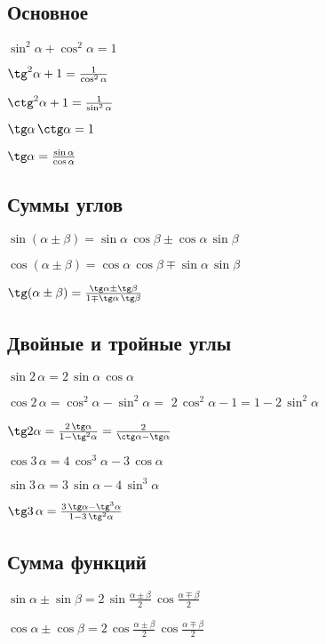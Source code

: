 \subsection{Основное}

$ \sin^2 \alpha + \cos^2 \alpha = 1 $

$ \tg^2 \alpha + 1 = \frac{1}{\cos^2 \alpha} $

$ \ctg^2 \alpha + 1 = \frac{1}{\sin^2 \alpha} $

$ \tg \alpha\, \ctg \alpha = 1 $

$ \tg \alpha = \frac{\sin \alpha}{\cos \alpha} $

\subsection{Суммы углов}

$ \sin(\alpha\pm \beta) = \sin \alpha\, \cos \beta \pm \cos \alpha\, \sin \beta $

$ \cos(\alpha\pm \beta) = \cos \alpha\, \cos \beta \mp \sin \alpha\, \sin \beta $

$ \tg (\alpha \pm \beta) = \frac{\tg \alpha \pm \tg \beta}{1 \mp \tg \alpha \, \tg \beta} $

\subsection{Двойные и тройные углы}

$ \sin 2\, \alpha = 2\, \sin \alpha\, \cos \alpha $

$ \cos 2\, \alpha = \cos^2 \alpha - \sin^2 \alpha = $ $ 2\, \cos^2 \alpha - 1 = 1 - 2\, \sin^2 \alpha $

$ \tg 2\alpha = \frac{2\, \tg \alpha}{1 - \tg^2 \alpha} = \frac{2}{\ctg \alpha - \tg \alpha} $

$ \cos 3\, \alpha = 4\, \cos^3 \alpha - 3\, \cos \alpha $

$ \sin 3\, \alpha = 3\, \sin \alpha - 4\, \sin^3 \alpha $

$ \tg 3\, \alpha = \frac{3\, \tg \alpha - \tg^3 \alpha}{1 - 3\, \tg^2 \alpha} $

\subsection{Сумма функций}

$ \sin \alpha \pm \sin \beta = 2\, \sin \frac{\alpha \pm \beta}{2}\, \cos \frac{\alpha \mp \beta}{2} $

$ \cos \alpha \pm \cos \beta = 2\, \cos \frac{\alpha \pm \beta}{2}\, \cos \frac{\alpha \mp \beta}{2} $

